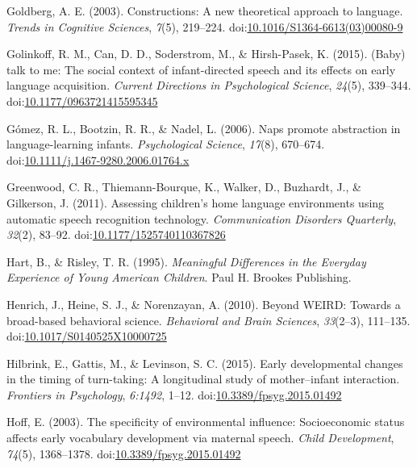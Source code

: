 \documentclass[floatsintext,man]{apa6}
\theoremstyle{definition}
\theoremstyle{definition}
\theoremstyle{definition}
\theoremstyle{remark}
\begin{document}
\hypertarget{ref-goldberg2003constructions}{}
Goldberg, A. E. (2003). Constructions: A new theoretical approach to
language. \emph{Trends in Cognitive Sciences}, \emph{7}(5), 219--224.
doi:\href{https://doi.org/10.1016/S1364-6613(03)00080-9}{10.1016/S1364-6613(03)00080-9}

\hypertarget{ref-golinkoff2015baby}{}
Golinkoff, R. M., Can, D. D., Soderstrom, M., \& Hirsh-Pasek, K. (2015).
(Baby) talk to me: The social context of infant-directed speech and its
effects on early language acquisition. \emph{Current Directions in
Psychological Science}, \emph{24}(5), 339--344.
doi:\href{https://doi.org/10.1177/0963721415595345}{10.1177/0963721415595345}

\hypertarget{ref-gomez2006naps}{}
Gómez, R. L., Bootzin, R. R., \& Nadel, L. (2006). Naps promote
abstraction in language-learning infants. \emph{Psychological Science},
\emph{17}(8), 670--674.
doi:\href{https://doi.org/10.1111/j.1467-9280.2006.01764.x}{10.1111/j.1467-9280.2006.01764.x}

\hypertarget{ref-greenwood2011assessing}{}
Greenwood, C. R., Thiemann-Bourque, K., Walker, D., Buzhardt, J., \&
Gilkerson, J. (2011). Assessing children's home language environments
using automatic speech recognition technology. \emph{Communication
Disorders Quarterly}, \emph{32}(2), 83--92.
doi:\href{https://doi.org/10.1177/1525740110367826}{10.1177/1525740110367826}

\hypertarget{ref-hart1995meaningful}{}
Hart, B., \& Risley, T. R. (1995). \emph{Meaningful Differences in the
Everyday Experience of Young American Children}. Paul H. Brookes
Publishing.

\hypertarget{ref-henrich2010beyond}{}
Henrich, J., Heine, S. J., \& Norenzayan, A. (2010). Beyond WEIRD:
Towards a broad-based behavioral science. \emph{Behavioral and Brain
Sciences}, \emph{33}(2--3), 111--135.
doi:\href{https://doi.org/10.1017/S0140525X10000725}{10.1017/S0140525X10000725}

\hypertarget{ref-hilbrink2015early}{}
Hilbrink, E., Gattis, M., \& Levinson, S. C. (2015). Early developmental
changes in the timing of turn-taking: A longitudinal study of
mother--infant interaction. \emph{Frontiers in Psychology},
\emph{6:1492}, 1--12.
doi:\href{https://doi.org/10.3389/fpsyg.2015.01492}{10.3389/fpsyg.2015.01492}

\hypertarget{ref-hoff2003specificity}{}
Hoff, E. (2003). The specificity of environmental influence:
Socioeconomic status affects early vocabulary development via maternal
speech. \emph{Child Development}, \emph{74}(5), 1368--1378.
doi:\href{https://doi.org/10.3389/fpsyg.2015.01492}{10.3389/fpsyg.2015.01492}
\end{document}
